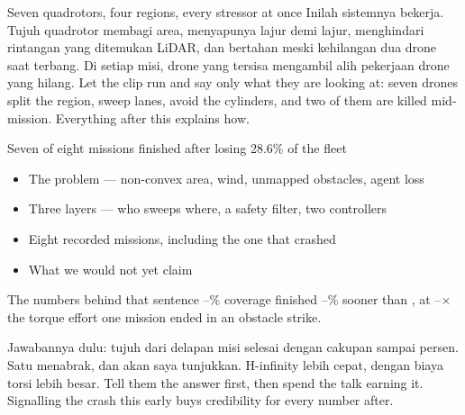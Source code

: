\documentclass[aspectratio=169,11pt,t]{beamer}
\begin{document}
\begin{frame}{Seven quadrotors, four regions, every stressor at once}
  \centering
    {Inilah sistemnya bekerja. Tujuh quadrotor membagi area, menyapunya lajur demi lajur, menghindari rintangan yang ditemukan LiDAR, dan bertahan meski kehilangan dua drone saat terbang. Di setiap misi, drone yang tersisa mengambil alih pekerjaan drone yang hilang.}
    {Let the clip run and say only what they are looking at: seven
        drones split the region, sweep lanes, avoid the cylinders, and two of
        them are killed mid-mission. Everything after this explains how.}
\end{frame}

\begin{frame}{Seven of eight missions finished after losing 28.6\% of the fleet}
  \begin{itemize}\bulletgap
    \item The problem --- non-convex area, wind, unmapped obstacles, agent loss
    \item Three layers --- who sweeps where, a safety filter, two controllers
    \item Eight recorded missions, including the one that crashed
    \item What we would not yet claim
  \end{itemize}
  \vfill
  \begin{callout}{The numbers behind that sentence}
    \CovMin--\CovMax\% coverage \textperiodcentered{} \hinf{} finished
    \TimeRedMin--\TimeRedMax\% sooner than \lqr, at
    \EffRatioMin--\EffRatioMax$\times$ the torque effort \textperiodcentered{}
    one mission ended in an obstacle strike.
  \end{callout}
    {Jawabannya dulu: tujuh dari delapan misi selesai dengan cakupan \CovMin\space sampai \CovMax\space persen. Satu menabrak, dan akan saya tunjukkan. H-infinity lebih cepat, dengan biaya torsi lebih besar.}
    {Tell them the answer first, then spend the talk earning it.
        Signalling the crash this early buys credibility for every number after.}
\end{frame}
\end{document}
